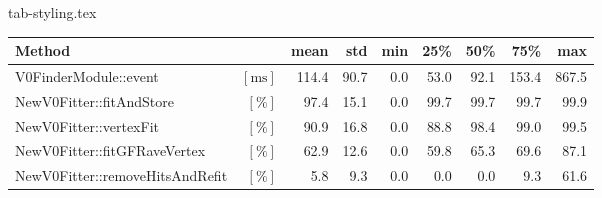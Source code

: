 {tab-styling.tex}

\newcommand{\unitSpec}[1]{$\left[\unit{#1}\right]$}

\centering
\begin{tabular}{ l r | D{3}{1}  D{2}{1}  D{1}{1}  D{2}{1}  D{2}{1}  D{3}{1}  D{3}{1} }
  Method                                      &                          & {mean} & {std} & {min} & {25\%} & {50\%} & {75\%} & {max} \\\hline
  V0FinderModule::event                       & \unitSpec{\milli\second} & 114.4  & 90.7  & 0.0   & 53.0   & 92.1   & 153.4  & 867.5 \\\hline
  \hspace{1em}NewV0Fitter::fitAndStore        & \unitSpec{\percent}      & 97.4   & 15.1  & 0.0   & 99.7   & 99.7   & 99.7   & 99.9  \\\hline
  \hspace{2em}NewV0Fitter::vertexFit          & \unitSpec{\percent}      & 90.9   & 16.8  & 0.0   & 88.8   & 98.4   & 99.0   & 99.5  \\\hline
  \hspace{3em}NewV0Fitter::fitGFRaveVertex    & \unitSpec{\percent}      & 62.9   & 12.6  & 0.0   & 59.8   & 65.3   & 69.6   & 87.1  \\\hline
  \hspace{2em}NewV0Fitter::removeHitsAndRefit & \unitSpec{\percent}      & 5.8    & 9.3   & 0.0   & 0.0    & 0.0    & 9.3    & 61.6  \\
\end{tabular}

